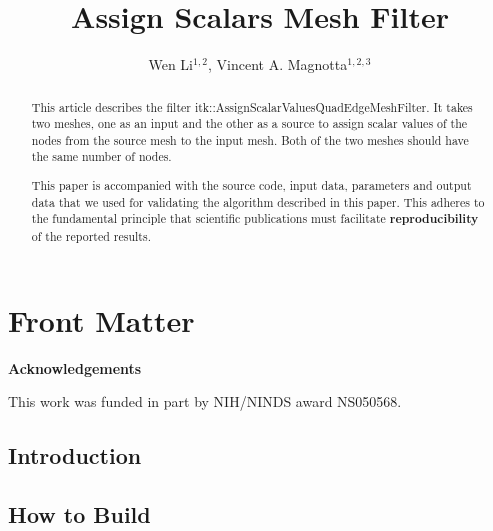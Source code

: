\documentclass{InsightArticle}
\title{Assign Scalars Mesh Filter}
\author{Wen Li$^{1,2}$, Vincent A. Magnotta$^{1,2,3}$}
\makeatletter
\newcommand\ackname{Acknowledgements}
\newenvironment{acknowledgements}{%
      \titlepage
      \null\vfil
      \@beginparpenalty\@lowpenalty
      \begin{center}%
        \bfseries \ackname
        \@endparpenalty\@M
      \end{center}}%
     {\par\vfil\null\endtitlepage}
\newenvironment{acknowledgements}{%
      \if@twocolumn
        \section*{\abstractname}%
      \else
        \small
        \begin{center}%
          {\bfseries \ackname\vspace{-.5em}\vspace{\z@}}%
        \end{center}%
        \quotation
      \fi}
      {\if@twocolumn\else\endquotation\fi}
\newcommand{\IJhandlerIDnumber}{3200}
\makeatother
\begin{document}
%
% 
\IJhandlefooter{\IJhandlerIDnumber}


\ifpdf
\else
\fi


\maketitle


\ifhtml
\chapter*{Front Matter\label{front}}
\fi


\begin{abstract}
 
This article describes the filter itk::AssignScalarValuesQuadEdgeMeshFilter.  It
takes two meshes, one as an input and the other as a source to assign scalar
values of the nodes from the source mesh to the input mesh.  Both of the two 
meshes should have the same number of nodes.

This paper is accompanied with the source code, input data, parameters and
output data that we used for validating the algorithm described in this paper.
This adheres to the fundamental principle that scientific publications must
facilitate \textbf{reproducibility} of the reported results.
\end{abstract}

\begin{acknowledgements}
This work was funded in part by NIH/NINDS award NS050568.
\end{acknowledgements}

\tableofcontents

\section{Introduction}


\section{How to Build}
\end{document}
